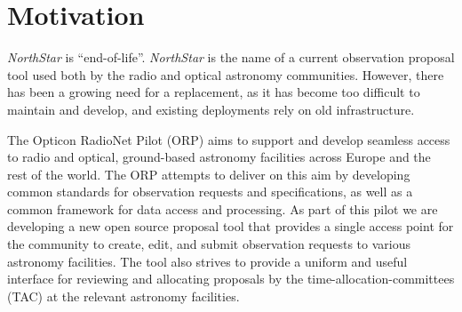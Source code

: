 \documentclass[11pt,twoside]{article}
\begin{document}





\section{Motivation}\label{sec:motivation}
\emph{NorthStar} is ``end-of-life''.
\emph{NorthStar} is the name of a current observation proposal tool used both by the radio and optical
astronomy communities.
However, there has been a growing need for a replacement, as it has become too difficult to maintain and develop,
and existing deployments rely on old infrastructure.

The Opticon RadioNet Pilot (ORP) aims to support and develop seamless access to radio and optical,
ground-based astronomy facilities across Europe and the rest of the world.
The ORP attempts to deliver on this aim by developing common standards for observation requests and
specifications, as well as a common framework for data access and processing.
As part of this pilot we are developing a new open source proposal tool that provides
a single access point for the community to create, edit, and submit observation requests to various astronomy
facilities.
The tool also strives to provide a uniform and useful interface for reviewing and allocating proposals by the
time-allocation-committees (TAC) at the relevant astronomy facilities.
\end{document}
